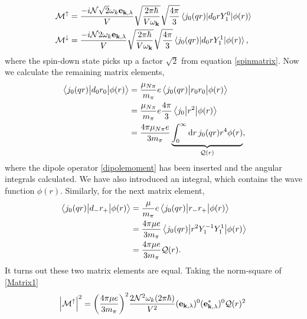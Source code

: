 \begin{align}
	\mathcal{M}^{\uparrow} %
	&= \frac{-i\mathcal{N}\sqrt{2}\omega_k\vec{e}_{\vec{k},\lambda}}{V}\sqrt{\frac{2\pi\hbar}{V\omega_{\vec{k}}}}\sqrt{\frac{4\pi}{3}}\mel*{j_0(qr)}{d_0 r Y_1^0}{\phi(r)} \\
	\mathcal{M}^{\downarrow}  %
	&=\frac{-i\mathcal{N}2\omega_k\vec{e}_{\vec{k},\lambda}}{V}\sqrt{\frac{2\pi\hbar}{V\omega_{\vec{k}}}}\sqrt{\frac{4\pi}{3}}\mel*{j_0(qr)}{d_0 r Y_1^1}{\phi(r)}, \\
\end{align}
where the spin-down state picks up a factor $\sqrt{2}$ from equation \eqref{spinmatrix}. Now we calculate the remaining matrix elements,
\begin{align}
	\mel{j_0(qr)}{d_0 r_0}{\phi(r)} &= \frac{\mu_{N\pi}}{m_\pi}e \mel{j_0(qr)}{r_0r_0}{\phi(r)} \\
	&= \frac{\mu_{N\pi}}{m_\pi}e\frac{4\pi}{3} \mel{j_0}{r^2}{\phi(r)} \\
	&= \frac{4\pi \mu_{N\pi} e}{3m_\pi} \underbrace{\int_0^\infty \text{d}r \, j_0(qr)r^4\phi(r)}_{\mathcal{Q}(r)}, \label{Matrix1}
\end{align}
where the dipole operator \eqref{dipolemoment} has been inserted and the angular integrals calculated. We have also introduced an integral, which contains the wave function $\phi(r)$. Similarly, for the next matrix element,
\begin{align}
	\mel{j_0(qr)}{d_{-}r_{+}}{\phi(r)} &= \frac{\mu}{m_\pi}e \mel{j_0(qr)}{r_{-}r_{+}}{\phi(r)} \\
	&= \frac{4\pi \mu e}{3 m_\pi} \mel{j_0(qr)}{r^2 Y_1^{-1}Y_1^1}{\phi(r)} \\
	&= \frac{4\pi \mu e}{3 m_\pi} \mathcal{Q}(r). \label{Matrix2}
\end{align}
It turns out these two matrix elements are equal. Taking the norm-square of \eqref{Matrix1}
\begin{equation}
	\abs{\mathcal{M}^\uparrow}^2 = \bigg( \frac{4\pi \mu e}{3m_\pi}\bigg)^2 \frac{2 \mathcal{N}^2\omega_k (2\pi \hbar)}{V^2}(\bm{\mathrm{e}}_{\bm{\mathrm{k}},\lambda})^0(\bm{\mathrm{e}}_{\bm{\mathrm{k}},\lambda}^*)^0 \mathcal{Q}(r)^2 
\end{equation}
